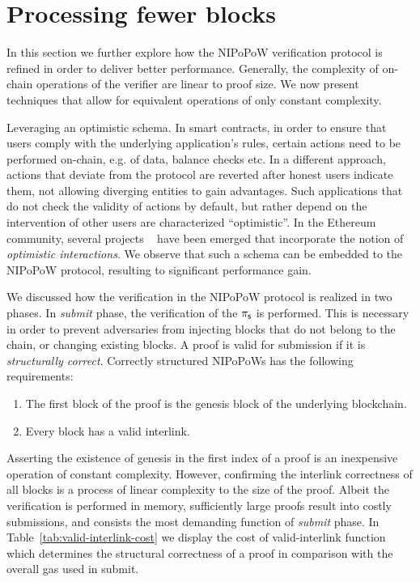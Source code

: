 \section{Processing fewer blocks}

In this section we further explore how the NIPoPoW verification protocol is
refined in order to deliver better performance. Generally, the complexity of
on-chain operations of the verifier are linear to proof size. We now present
techniques that allow for equivalent operations of only constant complexity.

\textsf{Leveraging an optimistic schema.} In smart contracts, in order to
ensure that users comply with the underlying application's rules, certain
actions need to be performed on-chain, e.g.  of data, balance checks etc. In a
different approach, actions that deviate from the protocol are reverted after
honest users indicate them, not allowing diverging entities to gain advantages.
Such applications that do not check the validity of actions by default, but
rather depend on the intervention of other users are characterized
``optimistic''. In the Ethereum community, several projects
~\cite{piza, plasma, rollups-1, rollups-2}
have been emerged that incorporate the notion of
\emph{optimistic interactions}. We observe that such a schema can be embedded
to the NIPoPoW protocol, resulting to significant performance gain.

We discussed how the verification in the NIPoPoW protocol is realized in
two phases. In \emph{submit} phase, the verification of the $\mathsf{\pi_{s}}$ is
performed.  This is necessary in order to prevent adversaries from injecting
blocks that do not belong to the chain, or changing existing blocks. A proof is
valid for submission if it is \emph{structurally correct}. Correctly structured
NIPoPoWs has the following requirements:

\begin{enumerate}
    \item The first block of the proof is the genesis block of the underlying
        blockchain.
    \item Every block has a valid interlink.
\end{enumerate}

Asserting the existence of genesis in the first index of a proof is an
inexpensive operation of constant complexity. However, confirming the interlink
correctness of all blocks is a process of linear complexity to the size of the
proof. Albeit the verification is performed in memory, sufficiently large
proofs result into costly submissions, and consists the most demanding
function of \emph{submit} phase. In Table~\ref{tab:valid-interlink-cost} we
display the cost of \textsf{valid-interlink} function which determines the
structural correctness of a proof in comparison with the overall gas used in
\textsf{submit}.

